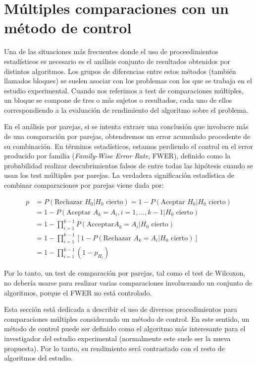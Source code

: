 \section{Múltiples comparaciones con un método de control}

Una de las situaciones más frecuentes donde el uso de proceedimientos estadísticos es necesario es el análisis conjunto de resultados obtenidos por distintos algoritmos. 
Los grupos de diferencias entre estos métodos (también llamados bloques) se suelen asociar con los problemas con los que se trabaja en el estudio experimental. 
Cuando nos referimos a test de comparaciones múltiples, un bloque se compone de tres o más sujetos o resultados, cada uno de ellos correspondiendo a la evaluación de rendimiento del algoritmo sobre el problema. 

En el análisis por parejas, si se intenta extraer una conclusión que involucre más de una comparación por parejas, obtendremos un error acumulado procedente de su combinación. 
En términos estadísticos, estamos perdiendo el control en el error producido por familia (\textit{Family-Wise Error Rate}, FWER), definido como la probabilidad realizar descubrimientos falsos de entre todas las hipótesis cuando se usan los test múltiples por parejas. 
La verdadera significación estadística de combinar comparaciones por parejas viene dada por: 

\begin{equation*}
\begin{aligned}
p & = P(\text{Rechazar }H_0 | H_0 \text{ cierto}) = 1 - P(\text{Aceptar }H_0 | H_0 \text{ cierto})\\
 & = 1 - P(\text{Aceptar }A_k=A_i, i=1,...,k -1 | H_0 \text{ cierto}) \\
 & = 1 - \prod_{i=1}^{k-1}P(\text{Acceptar} A_k=A_i | H_0 \text{ cierto}) \\ 
 & = 1- \prod_{i=1}^{k-1}[1 - P(\text{Rechazar } A_k=A_i | H_0 \text{ cierto} )] \\ 
 & = 1 - \prod_{i=1}^{k-1} (1-p_{H_i})
\end{aligned}
\end{equation*}

Por lo tanto, un test de comparación por parejas, tal como el test de Wilcoxon, no debería usarse para realizar varias comparaciones involucrando un conjunto de algoritmos, porque el FWER no está controlado. 

Esta sección está dedicada a describir el uso de diversos procedimientos para comparaciones múltiples considerando un método de control. 
En este sentido, un método de control puede ser definido como el algoritmo más interesante para el investigador del estudio experimental (normalmente este suele ser la nueva propuesta). 
Por lo tanto, su rendimiento será contrastado con el resto de algoritmos del estudio. 

